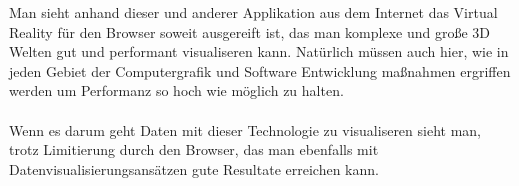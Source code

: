 
Man sieht anhand dieser und anderer Applikation aus dem Internet das Virtual Reality für den Browser soweit ausgereift ist, das man
komplexe und große 3D Welten gut und performant visualiseren kann. Natürlich müssen auch hier, wie in jeden Gebiet der Computergrafik und
Software Entwicklung maßnahmen ergriffen werden um Performanz so hoch wie möglich zu halten.\\ \\
Wenn es darum geht Daten mit dieser Technologie zu visualiseren sieht man, trotz Limitierung durch den Browser, das man ebenfalls mit
Datenvisualisierungsansätzen gute Resultate erreichen kann.

